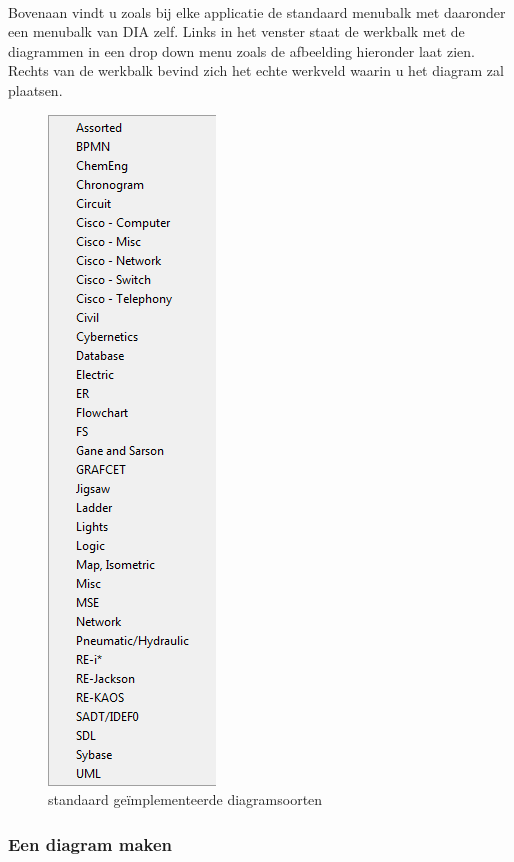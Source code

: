 \documentclass[12pt,a4paper]{report}
\begin{document}
\begin{flushleft}
\paragraph*{}
Bovenaan vindt u zoals bij elke applicatie de standaard menubalk met daaronder een menubalk van DIA zelf. Links in het venster staat de werkbalk met de diagrammen in een drop down menu zoals de afbeelding hieronder laat zien. Rechts van de werkbalk bevind zich het echte werkveld waarin u het diagram zal plaatsen.
\begin{figure}[H]
\includegraphics[scale=0.5]{images/werkveld_02.png}
\centering 
\vspace{-10pt}
\caption{standaard geïmplementeerde diagramsoorten}
\end{figure}
\subsubsection{Een diagram maken}

\end{flushleft}
\end{document}
